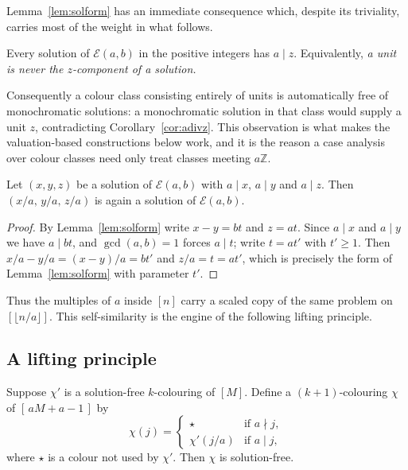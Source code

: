 Lemma~\ref{lem:solform} has an immediate consequence which, despite its
triviality, carries most of the weight in what follows.

\begin{corollary}\label{cor:adivz}
Every solution of $\mathcal{E}(a,b)$ in the positive integers has $a \mid z$.
Equivalently, \emph{a unit is never the $z$-component of a solution.}
\end{corollary}

Consequently a colour class consisting entirely of units is automatically
free of monochromatic solutions: a monochromatic solution in that class would
supply a unit $z$, contradicting Corollary~\ref{cor:adivz}. This observation
is what makes the valuation-based constructions below work, and it is the
reason a case analysis over colour classes need only treat classes meeting
$a\mathbb{Z}$.

\begin{lemma}\label{lem:selfsim}
Let $(x,y,z)$ be a solution of $\mathcal{E}(a,b)$ with $a \mid x$, $a \mid y$
and $a \mid z$. Then $(x/a,\, y/a,\, z/a)$ is again a solution of
$\mathcal{E}(a,b)$.
\end{lemma}

\begin{proof}
By Lemma~\ref{lem:solform} write $x - y = bt$ and $z = at$. Since $a \mid x$
and $a \mid y$ we have $a \mid bt$, and $\gcd(a,b) = 1$ forces $a \mid t$;
write $t = a t'$ with $t' \ge 1$. Then
$x/a - y/a = (x-y)/a = bt' $ and $z/a = t = a t'$, which is precisely the
form of Lemma~\ref{lem:solform} with parameter $t'$.
\end{proof}

Thus the multiples of $a$ inside $[n]$ carry a scaled copy of the same
problem on $[\lfloor n/a \rfloor]$. This self-similarity is the engine of the
following lifting principle.

\subsection{A lifting principle}

\begin{proposition}[Lifting]\label{prop:lift}
Suppose $\chi'$ is a solution-free $k$-colouring of $[M]$. Define a
$(k+1)$-colouring $\chi$ of $[\,aM + a - 1\,]$ by
\[
  \chi(j) =
  \begin{cases}
    \star & \text{if } a \nmid j, \\[2pt]
    \chi'(j/a) & \text{if } a \mid j,
  \end{cases}
\]
where $\star$ is a colour not used by $\chi'$. Then $\chi$ is solution-free.
\end{proposition}


